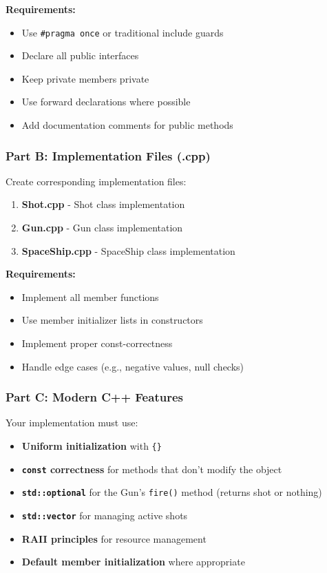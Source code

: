 \documentclass[
]{article}
\providecommand{\tightlist}{%
  \setlength{\itemsep}{0pt}\setlength{\parskip}{0pt}}
\begin{document}
\textbf{Requirements:}

\begin{itemize}
\tightlist
\item
  Use \texttt{\#pragma\ once} or traditional include guards
\item
  Declare all public interfaces
\item
  Keep private members private
\item
  Use forward declarations where possible
\item
  Add documentation comments for public methods
\end{itemize}

\subsubsection{Part B: Implementation Files
(.cpp)}\label{part-b-implementation-files-.cpp}

Create corresponding implementation files:

\begin{enumerate}
\def\labelenumi{\arabic{enumi}.}
\tightlist
\item
  \textbf{Shot.cpp} - Shot class implementation
\item
  \textbf{Gun.cpp} - Gun class implementation\\
\item
  \textbf{SpaceShip.cpp} - SpaceShip class implementation
\end{enumerate}

\textbf{Requirements:}

\begin{itemize}
\tightlist
\item
  Implement all member functions
\item
  Use member initializer lists in constructors
\item
  Implement proper const-correctness
\item
  Handle edge cases (e.g., negative values, null checks)
\end{itemize}

\subsubsection{Part C: Modern C++
Features}\label{part-c-modern-c-features}

Your implementation must use:

\begin{itemize}
\tightlist
\item
  \textbf{Uniform initialization} with \texttt{\{\}}
\item
  \textbf{\texttt{const} correctness} for methods that don't modify the
  object
\item
  \textbf{\texttt{std::optional}} for the Gun's \texttt{fire()} method
  (returns shot or nothing)
\item
  \textbf{\texttt{std::vector}} for managing active shots
\item
  \textbf{RAII principles} for resource management
\item
  \textbf{Default member initialization} where appropriate
\end{itemize}
\end{document}
